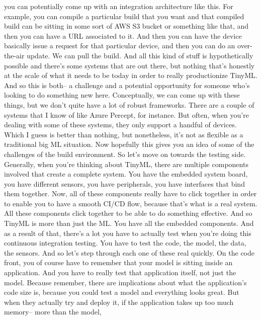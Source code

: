 {{{    you can potentially come up with an integration architecture like this.
    For example, you can compile a particular build that you want
    and that compiled build can be sitting in some sort of AWS S3
    bucket or something like that, and then you can have a URL associated to it.
    And then you can have the device basically issue
    a request for that particular device, and then you
    can do an over-the-air update.
    We can pull the build.
    And all this kind of stuff is hypothetically possible
    and there's some systems that are out there,
    but nothing that's honestly at the scale of what it needs to be today in order
    to really productionize TinyML.
    And so this is both-- a challenge and a potential opportunity for someone
    who's looking to do something new here.
    Conceptually, we can come up with these things,
    but we don't quite have a lot of robust frameworks.
    There are a couple of systems that I know
    of like Azure Percept, for instance.
    But often, when you're dealing with some of these systems,
    they only support a handful of devices.
    Which I guess is better than nothing, but nonetheless, it's
    not as flexible as a traditional big ML situation.
    Now hopefully this gives you an idea of some
    of the challenges of the build environment.
    So let's move on towards the testing side.
    Generally, when you're thinking about TinyML,
    there are multiple components involved that create a complete system.
    You have the embedded system board, you have different sensors,
    you have peripherals, you have interfaces that bind them together.
    Now, all of these components really have to click together
    in order to enable you to have a smooth CI/CD flow, because that's
    what is a real system.
    All these components click together to be able to do something effective.
    And so TinyML is more than just the ML.
    You have all the embedded components.
    And as a result of that, there's a lot you
    have to actually test when you're doing this continuous integration testing.
    You have to test the code, the model, the data, the sensors.
    And so let's step through each one of these real quickly.
    On the code front, you of course have to remember that your model is
    sitting inside an application.
    And you have to really test that application itself, not just the model.
    Because remember, there are implications about what the application's code
    size is, because you could test a model and everything looks great.
    But when they actually try and deploy it,
    if the application takes up too much memory-- more than the model,
}}}
